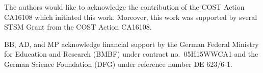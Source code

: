 The authors would like to acknowledge the contribution of the COST Action CA16108 which initiated this work.
Moreover, this work was supported by sveral STSM Grant from the COST Action CA16108.

BB, AD, and MP acknowledge financial support by the
German Federal Ministry for Education and Research (BMBF) under
contract no.~05H15WWCA1 and the German Science Foundation (DFG) under
reference number DE 623/6-1.